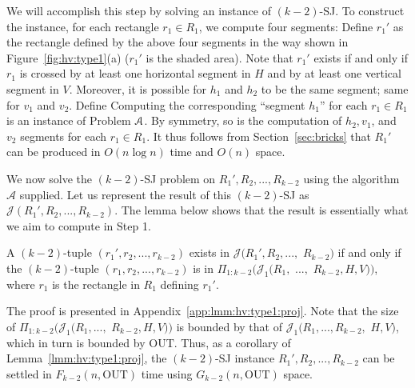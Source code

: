 \documentclass[sigconf]{acmart}
\def\vgap{\vspace{1mm}}
\def\A{\mathcal{A}}
\def\J{\mathcal{J}}
\def\out{\mathrm{OUT}}
\begin{document}
 We will accomplish this step by solving an instance of $(k-2)$-SJ. To construct the instance, for each rectangle $r_1 \in R_1$, we compute four segments:
Define $r_1'$ as the rectangle defined by the above four segments in the way shown in Figure~\ref{fig:hv:type1}(a) ($r_1'$ is the shaded area). Note that $r_1'$ exists if and only if $r_1$ is crossed by at least one horizontal segment in $H$ and by at least one vertical segment in $V$. Moreover, it is possible for $h_1$ and $h_2$ to be the same segment; same for $v_1$ and $v_2$. Define
Computing the corresponding ``segment $h_1$'' for each $r_1 \in R_1$ is an instance of Problem $\EuScript{A}$. By symmetry, so is the computation of $h_2, v_1$, and $v_2$ segments for each $r_1 \in R_1$. It thus follows from Section~\ref{sec:bricks} that $R_1'$ can be produced in $O(n \log n)$ time and $O(n)$ space.

\vgap

We now solve the $(k-2)$-SJ problem on $R_1', R_2, ..., R_{k-2}$ using the algorithm $\A$ supplied. Let us represent the result of this $(k-2)$-SJ as $\J(R_1', R_2, ..., R_{k-2})$. The lemma below shows that the result is essentially what we aim to compute in Step 1.

\begin{lemma} \label{lmm:hv:type1:proj}
    A $(k-2)$-tuple $(r_1', r_2, ..., r_{k-2})$ exists in $\J(R_1', R_2, ...,$ $R_{k-2})$ if and only if the $(k-2)$-tuple $(r_1, r_2, ..., r_{k-2})$ is in $\Pi_{1:k-2}(\J_1(R_1,$ $...,$ $R_{k-2}, H, V))$, where $r_1$ is the rectangle in $R_1$ defining $r_1'$.
\end{lemma}

The proof is presented in Appendix~\ref{app:lmm:hv:type1:proj}. Note that the size of $\Pi_{1:k-2}(\J_1(R_1, ...,$ $R_{k-2}, H, V))$ is bounded by that of $\J_1(R_1, ..., R_{k-2},$ $H, V)$, which in turn is bounded by $\out$. Thus, as a corollary of Lemma~\ref{lmm:hv:type1:proj}, the $(k-2)$-SJ instance $R_1', R_2, ..., R_{k-2}$  can be settled in $F_{k-2}(n, \out)$ time using $G_{k-2}(n, \out)$ space.
\end{document}
